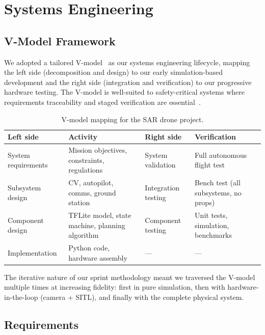 \section{Systems Engineering}
\label{sec:systems_engineering}

\subsection{V-Model Framework}

We adopted a tailored V-model~\cite{forsberg1991relationship} as our systems engineering lifecycle, mapping the left side (decomposition and design) to our early simulation-based development and the right side (integration and verification) to our progressive hardware testing. The V-model is well-suited to safety-critical systems where requirements traceability and staged verification are essential~\cite{incose2015, blanchard2011systems}.

\begin{table}[htbp]
\centering
\compactTable
\caption{V-model mapping for the SAR drone project.}
\label{tab:vmodel}
\begin{tabularx}{\linewidth}{l X l X}
\toprule
\textbf{Left side} & \textbf{Activity} & \textbf{Right side} & \textbf{Verification} \\
\midrule
System requirements & Mission objectives, constraints, regulations & System validation & Full autonomous flight test \\
Subsystem design & CV, autopilot, comms, ground station & Integration testing & Bench test (all subsystems, no props) \\
Component design & TFLite model, state machine, planning algorithm & Component testing & Unit tests, simulation, benchmarks \\
Implementation & Python code, hardware assembly & --- & --- \\
\bottomrule
\end{tabularx}
\end{table}

The iterative nature of our sprint methodology meant we traversed the V-model multiple times at increasing fidelity: first in pure simulation, then with hardware-in-the-loop (camera + SITL), and finally with the complete physical system.

\subsection{Requirements}

